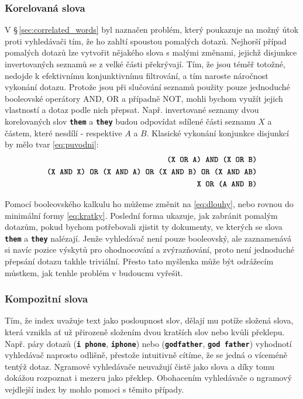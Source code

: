 \documentclass[11pt,letterpaper,oneside,openright]{book}
\newcommand{\bftt}[1]{\texttt{\textbf{#1}}}
\begin{document}
\subsubsection{Korelovaná slova}
V \S\,\ref{sec:correlated_words} byl naznačen problém, který poukazuje na možný
útok proti vyhledávači tím, že ho zahltí spoustou pomalých dotazů. Nejhorší
případ pomalých dotazů lze vytvořit nějakého slova s malými změnami, jejichž
disjunkce invertovaných seznamů se z velké části překrývají. Tím, že jsou téměř
totožné, nedojde k efektivnímu konjunktivnímu filtrování, a tím naroste
náročnost vykonání dotazu. Protože jsou při slučování seznamů použity pouze
jednoduché booleovské operátory AND, OR a případně NOT, mohli bychom využít
jejich vlastností a dotaz podle nich přepsat. Např. invertované seznamy dvou
korelovaných slov \bftt{them} a \bftt{they} budou odpovídat sdílené části
seznamu $X$ a částem, které nesdílí - respektive $A$ a $B$. Klasické vykonání
konjunkce disjunkcí by mělo tvar \ref{eq:puvodni}:
\begin{align}
\bftt{(X OR A) AND (X OR B)} \label{eq:puvodni} \\
\bftt{(X AND X) OR (X AND A) OR (X AND B) OR (X AND AB)} \label{eq:dlouhy} \\
\bftt{X OR (A AND B)} \label{eq:kratky}
\end{align}

Pomocí booleovského kalkulu ho můžeme změnit na \ref{eq:dlouhy}, nebo rovnou do
minimální formy \ref{eq:kratky}. Poslední forma ukazuje, jak zabránit pomalým
dotazům, pokud bychom potřebovali zjistit ty dokumenty, ve kterých se slova
\bftt{them} a \bftt{they} nalézají. Jenže vyhledávač není pouze booleovský, ale
zaznamenává si navíc pozice výskytů pro ohodnocování a zvýrazňování, proto není
jednoduché přepsání dotazu takhle triviální. Přesto tato myšlenka může být
odrážecím můstkem, jak tenhle problém v budoucnu vyřešit.

\subsubsection{Kompozitní slova}
Tím, že index uvažuje text jako posloupnost slov, dělají mu potíže složená
slova, která vznikla ať už přirozeně složením dvou kratších slov nebo kvůli
překlepu. Např. páry dotazů (\bftt{i phone}, \bftt{iphone}) nebo
(\bftt{godfather}, \bftt{god father}) vyhodnotí vyhledávač naprosto odlišně,
přestože intuitivně cítíme, že se jedná o víceméně tentýž dotaz. Ngramové
vyhledávače neuvažují čistě jako slova a díky tomu dokážou rozpoznat i mezeru
jako překlep. Obohacením vyhledávače o ngramový vejdlejší index by mohlo pomoci
s těmito případy.
\end{document}
